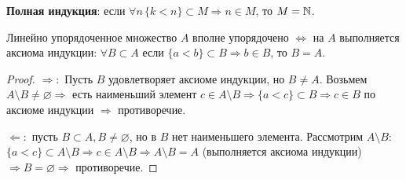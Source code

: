 \textbf{Полная индукция}: если $\forall n\, \{k < n\} \subset M \Rightarrow n \in M$, то $M=\mathbb{N}$.

\begin{claim}
	Линейно упорядоченное множество $A$ вполне упорядочено $\Leftrightarrow$ на $A$ выполняется аксиома индукции: $\forall B \subset A$ если $\{a < b\} \subset B \Rightarrow b \in B$, то $B=A$.
\end{claim}
\begin{proof}
	$\Rightarrow:$ Пусть $B$ удовлетворяет аксиоме индукции, но $B \neq A$. Возьмем $A \setminus B \neq \varnothing \Rightarrow$ есть наименьший элемент $c \in A \setminus B \Rightarrow \{a < c\} \subset B \Rightarrow c \in B$ по аксиоме индукции $\Rightarrow$ противоречие.
	
	$\Leftarrow:$ пусть $B \subset A, B \neq \varnothing$, но в $B$ нет наименьшего элемента. Рассмотрим $A \setminus B$: $\{a < c\} \subset A \setminus B \Rightarrow c \in A \setminus B \Rightarrow A \setminus B = A$ (выполняется аксиома индукции) $\Rightarrow B=\varnothing \Rightarrow$ противоречие.
\end{proof}